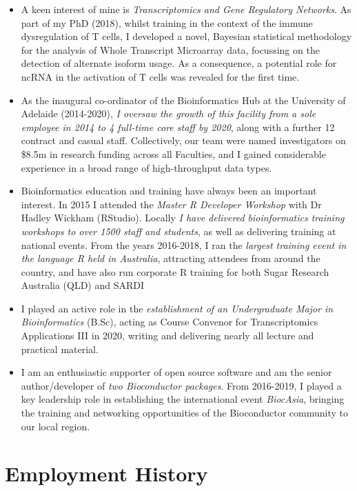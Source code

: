 \documentclass[11pt,a4paper,]{moderncv}
\providecommand{\tightlist}{%
	\setlength{\itemsep}{0pt}\setlength{\parskip}{0pt}}
\begin{document}
\begin{itemize}
\tightlist
\item
  A keen interest of mine is \emph{Transcriptomics and Gene Regulatory
  Networks}. As part of my PhD (2018), whilst training in the context of
  the immune dysregulation of T cells, I developed a novel, Bayesian
  statistical methodology for the analysis of Whole Transcript
  Microarray data, focussing on the detection of alternate isoform
  usage. As a consequence, a potential role for ncRNA in the activation
  of T cells was revealed for the first time.
\item
  As the inaugural co-ordinator of the Bioinformatics Hub at the
  University of Adelaide (2014-2020), \emph{I oversaw the growth of this
  facility from a sole employee in 2014 to 4 full-time core staff by
  2020}, along with a further 12 contract and casual staff.
  Collectively, our team were named investigators on \$8.5m in research
  funding across all Faculties, and I gained considerable experience in
  a broad range of high-throughput data types.
\item
  Bioinformatics education and training have always been an important
  interest. In 2015 I attended the \emph{Master R Developer Workshop}
  with Dr Hadley Wickham (RStudio). Locally \emph{I have delivered
  bioinformatics training workshops to over 1500 staff and students}, as
  well as delivering training at national events. From the years
  2016-2018, I ran the \emph{largest training event in the language R
  held in Australia}, attracting attendees from around the country, and
  have also run corporate R training for both Sugar Research Australia
  (QLD) and SARDI
\item
  I played an active role in the \emph{establishment of an Undergraduate
  Major in Bioinformatics} (B.Sc), acting as Course Convenor for
  Transcriptomics Applications III in 2020, writing and delivering
  nearly all lecture and practical material.
\item
  I am an enthusiastic supporter of open source software and am the
  senior author/developer of \emph{two Bioconductor packages}. From
  2016-2019, I played a key leadership role in establishing the
  international event \emph{BiocAsia}, bringing the training and
  networking opportunities of the Bioconductor community to our local
  region.
\end{itemize}

\small

\hypertarget{employment-history}{%
\section{Employment History}\label{employment-history}}
\end{document}
